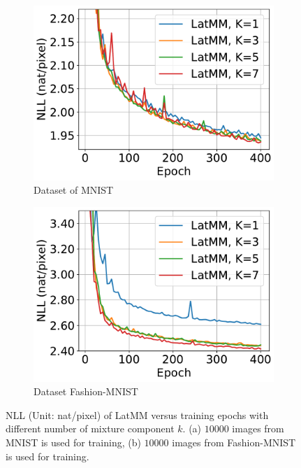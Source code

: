 \begin{figure}[!tp]
  \captionsetup[subfigure]{justification=centering}
  \centering
  \begin{subfigure}{.4\textwidth}
    \centering
    \includegraphics[width=1\linewidth]{images/supply/mnist_LatMM_nll_curves-crop.pdf}
    
    \caption{Dataset of MNIST}
    \label{fig-latmm-mnist-nll-curve}
  \end{subfigure}\hspace{1cm}
  \begin{subfigure}{.4\textwidth}
    \centering
    \includegraphics[width=1\linewidth]{images/supply/fashion_LatMM_nll_curves-crop.pdf}
    
    \caption{Dataset Fashion-MNIST}
    \label{fig-latmm-fsh-nll-curve}
  \end{subfigure}
  
  \caption{NLL (Unit: nat/pixel) of LatMM versus training epochs with different number of mixture component $k$. (a) $10000$ images from MNIST is used for training, (b) $10000$ images from Fashion-MNIST is used for training.}
  \label{fig:latmm-nll}
\end{figure}


